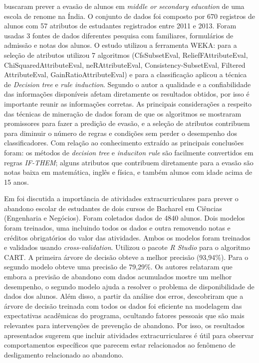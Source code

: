 \documentclass[diss,capa]{texufpel}
\begin{document}
\citet{pradeep2015students} buscaram prever a evasão de alunos em \textit{middle or secondary education} de uma escola de renome na Índia. O conjunto de dados foi composto por 670 registros de alunos com 57 atributos de estudantes registrados entre 2011 e 2013. Foram usadas 3 fontes de dados diferentes pesquisa com familiares, formulários de admissão e notas dos alunos. O estudo utilizou a ferramenta WEKA: para a seleção de atributos utilizou 7 algoritmos (CfsSubsetEval, ReliefFAttributeEval, ChiSquaredAttributeEval, neRAttributeEval, Consistency-SubsetEval, Filtered AttributeEval, GainRatioAttributeEval) e para a classificação aplicou a técnica de \textit{Decision tree} e \textit{rule induction}. Segundo o autor a qualidade e a confiabilidade das informações disponíveis afetam diretamente os resultados obtidos, por isso é importante reunir as informações corretas. As principais considerações a respeito das técnicas de mineração de dados foram de que os algoritmos se mostraram promissores para fazer a predição de evasão, e a seleção de atributos contribuem para diminuir o número de regras e condições sem perder o desempenho dos classificadores. Com relação ao conhecimento extraído as principais conclusões foram: os métodos de \textit{decision tree} e \textit{induciton rule} são facilmente convertidos em regras \textit{IF-THEM}; alguns atributos que contribuem diretamente para a evasão são notas baixa em matemática, inglês e física, e também alunos com idade acima de 15 anos.

Em \citet{hasbun2016extracurricular} foi discutida a importância de atividades extracurriculares para prever o abandono escolar de estudantes de dois cursos de Bacharel em Ciências (Engenharia e Negócios). Foram coletados dados de 4840 alunos. Dois modelos foram treinados, uma incluindo todos os dados e outra removendo notas e créditos obrigatórios do valor das atividades. Ambos os modelos foram treinados e validados usando \textit{cross-validation}. Utilizou o pacote \textit{R Studio} para o algoritmo CART. A primeira árvore de decisão obteve a melhor precisão (93,94\%). Para o segundo modelo obteve uma precisão de 79,29\%. Os autores relataram que embora a previsão de abandono com dados acumulados mostre um melhor desempenho, o segundo modelo ajuda a resolver o problema de disponibilidade de dados dos alunos. Além disso, a partir da análise dos erros, descobriram que a árvore de decisão treinada com todos os dados foi eficiente na modelagem das expectativas acadêmicas do programa, ocultando fatores pessoais que são mais relevantes para intervenções de prevenção de abandono. Por isso, os resultados apresentados sugerem que incluir atividades extracurriculares é útil para observar comportamentos específicos que parecem estar relacionados ao fenômeno de desligamento relacionado ao abandono.
\end{document}
